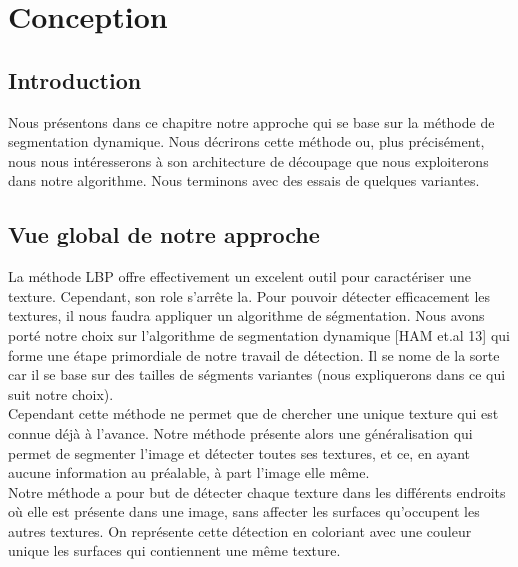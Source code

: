 
\chapter{Conception} %

\label{Chapter2} %



\section{Introduction}

Nous présentons dans ce chapitre notre approche qui se base sur la méthode de segmentation dynamique. 
Nous décrirons cette méthode ou, plus précisément, nous nous intéresserons à son architecture de découpage que nous exploiterons dans notre algorithme.
Nous terminons avec des essais de quelques variantes.

\section{Vue global de notre approche}
La méthode LBP offre effectivement un excelent outil pour caractériser une texture. Cependant, son role s'arrête la. Pour pouvoir détecter efficacement les textures, il nous faudra appliquer un algorithme de ségmentation. Nous avons porté notre choix sur l'algorithme de segmentation dynamique [HAM et.al 13] qui forme une étape primordiale de notre travail de détection. Il se nome de la sorte car il se base sur des tailles de ségments variantes (nous expliquerons dans ce qui suit notre choix). \\

Cependant cette méthode ne permet que de chercher une unique texture qui est connue déjà à l'avance. Notre méthode présente alors une généralisation qui permet de segmenter l'image et détecter toutes ses textures, et ce, en ayant aucune information au préalable, à part l'image elle même.\\

Notre méthode a pour but de détecter chaque texture dans les différents endroits où elle est présente dans une image, sans affecter les surfaces qu'occupent les autres textures. On représente cette détection en coloriant avec une couleur unique les surfaces qui contiennent une même texture.\\

